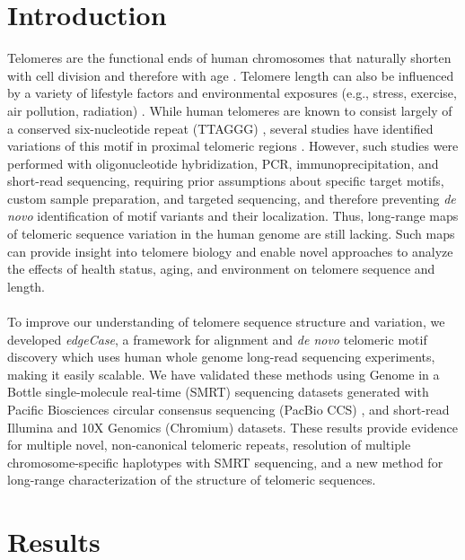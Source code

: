 \documentclass{article}
\begin{document}
\section*{Introduction} 
    Telomeres are the functional ends of human chromosomes that naturally shorten with cell division and therefore with age \cite{teloaging}.
    Telomere length can also be influenced by a variety of lifestyle factors and environmental exposures
        (e.g., stress, exercise, air pollution, radiation) \cite{teloeffects}.
    While human telomeres are known to consist largely of a conserved six-nucleotide repeat (TTAGGG) \cite{moyzis},
        several studies have identified variations of this motif in proximal telomeric regions
            \cite{telovars1989,telovars1999,telovars2018,telovars2019}.
    However, such studies were performed with oligonucleotide hybridization, PCR, immunoprecipitation, and short-read sequencing,
        requiring prior assumptions about specific target motifs, custom sample preparation, and targeted sequencing,
        and therefore preventing \textit{de novo} identification of motif variants and their localization.
    Thus, long-range maps of telomeric sequence variation in the human genome are still lacking.
    Such maps can provide insight into telomere biology and enable novel approaches to analyze the effects of
        health status, aging, and environment on telomere sequence and length.
    \\~\\
    To improve our understanding of telomere sequence structure and variation, we developed \textit{edgeCase},
        a framework for alignment and \textit{de novo} telomeric motif discovery
        which uses human whole genome long-read sequencing experiments,
            making it easily scalable.
    We have validated these methods using
        Genome in a Bottle \cite{giab} single-molecule real-time (SMRT) sequencing datasets
            generated with Pacific Biosciences circular consensus sequencing (PacBio CCS) \cite{pacbio,pacbioccs},
        and short-read Illumina \cite{illumina} and 10X Genomics (Chromium) \cite{10x} datasets.
    These results provide evidence for
        multiple novel, non-canonical telomeric repeats,
        resolution of multiple chromosome-specific haplotypes with SMRT sequencing,
        and a new method for long-range characterization of the structure of telomeric sequences.

\section*{Results} 
\end{document}
